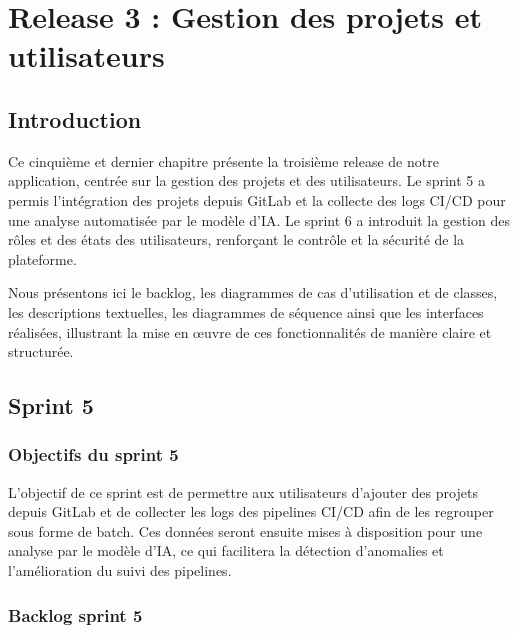 \chapter {Release 3 : Gestion des projets et utilisateurs}

\section{Introduction} 
Ce cinquième et dernier chapitre présente la troisième release de notre application, centrée sur la gestion des projets et des utilisateurs. Le sprint 5 a permis l’intégration des projets depuis GitLab et la collecte des logs CI/CD pour une analyse automatisée par le modèle d’IA. Le sprint 6 a introduit la gestion des rôles et des états des utilisateurs, renforçant le contrôle et la sécurité de la plateforme.

Nous présentons ici le backlog, les diagrammes de cas d’utilisation et de classes, les descriptions textuelles, les diagrammes de séquence ainsi que les interfaces réalisées, illustrant la mise en œuvre de ces fonctionnalités de manière claire et structurée.

\section{Sprint 5}
\subsection{Objectifs du sprint 5}
L’objectif de ce sprint est de permettre aux utilisateurs d’ajouter des projets depuis GitLab et de collecter les logs des pipelines CI/CD afin de les regrouper sous forme de batch. Ces données seront ensuite mises à disposition pour une analyse par le modèle d’IA, ce qui facilitera la détection d’anomalies et l’amélioration du suivi des pipelines.
\subsection{Backlog sprint 5}

\begin{table}[H]
\centering
\renewcommand{\arraystretch}{1.4}
\captionsetup{justification=centering}
\caption{Backlog Sprint 5}
\end{table}

